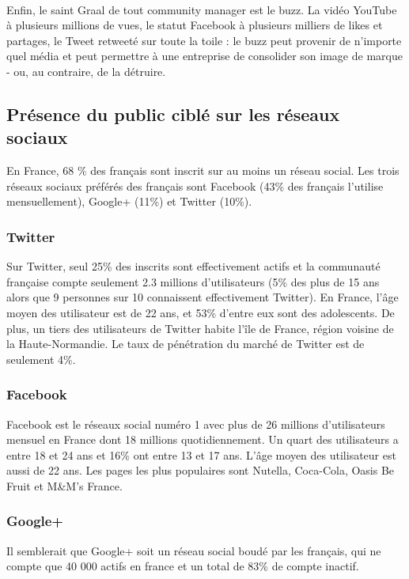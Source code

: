 \paragraph{}
Enfin, le saint Graal de tout community manager est le buzz. La vidéo YouTube à plusieurs millions de vues, 
le statut Facebook à plusieurs milliers de likes et partages, le Tweet retweeté sur toute la toile : le buzz 
peut provenir de n'importe quel média et peut permettre à une entreprise de consolider son image de marque - ou, 
au contraire, de la détruire. 

\subsection{Présence du public ciblé sur les réseaux sociaux}
En France, 68 \% des français sont inscrit sur au moins un réseau social. Les trois réseaux sociaux préférés des français sont Facebook (43\% des français l'utilise mensuellement), Google+ (11\%) et Twitter (10\%).

\subsubsection{Twitter}
Sur Twitter, seul 25\% des inscrits sont effectivement actifs et la communauté française compte seulement 2.3 millions d'utilisateurs (5\% des plus de 15 ans alors que 9 personnes sur 10 connaissent effectivement Twitter).
En France, l'âge moyen des utilisateur est de 22 ans, et 53\% d'entre eux sont des adolescents. De plus, un tiers des utilisateurs de Twitter habite l'île de France, région voisine de la Haute-Normandie. Le taux de pénétration du marché de Twitter est de seulement 4\%.

\subsubsection{Facebook}
Facebook est le réseaux social numéro 1 avec plus de 26 millions d'utilisateurs mensuel en France dont 18 millions quotidiennement. Un quart des utilisateurs a entre 18 et 24 ans et 16\% ont entre 13 et 17 ans. L'âge moyen des utilisateur est aussi de 22 ans.
Les pages les plus populaires sont Nutella, Coca-Cola, Oasis Be Fruit et M\&M's France. 

\subsubsection{Google+}
Il semblerait que Google+ soit un réseau social boudé par les français, qui ne compte que 40 000 actifs en france et un total de 83\% de compte inactif.

